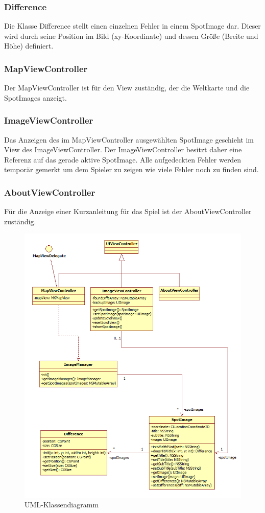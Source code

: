 \subsubsection*{Difference}
Die Klasse Difference stellt einen einzelnen Fehler in einem SpotImage dar. Dieser wird durch seine Position im Bild (xy-Koordinate) und dessen Größe (Breite und Höhe) definiert.

\subsubsection*{MapViewController}
Der MapViewController ist für den View zuständig, der die Weltkarte und die SpotImages anzeigt.

\subsubsection*{ImageViewController}
Das Anzeigen des im MapViewController ausgewählten SpotImage geschieht im View des ImageViewController. Der ImageViewController besitzt daher eine Referenz auf das gerade aktive SpotImage. Alle aufgedeckten Fehler werden temporär gemerkt um dem Spieler zu zeigen wie viele Fehler noch zu finden sind.

\subsubsection*{AboutViewController}
Für die Anzeige einer Kurzanleitung für das Spiel ist der AboutViewController zuständig.


\begin{figure}[H]
  \centering
  \includegraphics[width=1.0\textwidth]{bilder/uml.png}
  \caption{UML-Klassendiagramm}
  \label{uml}
\end{figure}